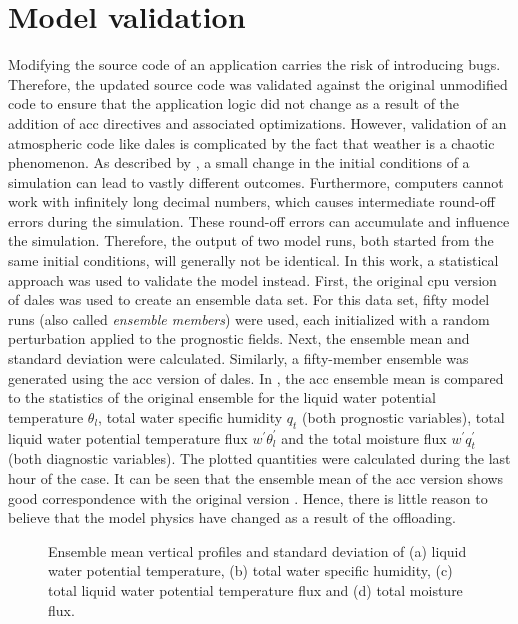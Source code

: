 \section{Model validation}
Modifying the source code of an application carries the risk of introducing bugs. Therefore, the updated source code was validated against the original unmodified code to ensure that the application logic did not change as a result of the addition of \acrshort{acc} directives and associated optimizations. However, validation of an atmospheric code like \acrshort{dales} is complicated by the fact that weather is a chaotic phenomenon. As described by \citet{lorenzDeterministicNonperiodicFlow1963}, a small change in the initial conditions of a simulation can lead to vastly different outcomes. Furthermore, computers cannot work with infinitely long decimal numbers, which causes intermediate round-off errors during the simulation. These round-off errors can accumulate and influence the simulation. Therefore, the output of two model runs, both started from the same initial conditions, will generally not be identical. In this work, a statistical approach was used to validate the model instead. First, the original \acrshort{cpu} version of \acrshort{dales} was used to create an ensemble data set. For this data set, fifty model runs (also called \emph{ensemble members}) were used, each initialized with a random perturbation applied to the prognostic fields. Next, the ensemble mean and standard deviation were calculated. Similarly, a fifty-member ensemble was generated using the \acrshort{acc} version of \acrshort{dales}. In , the \acrshort{acc} ensemble mean is compared to the statistics of the original ensemble for the liquid water potential temperature $\theta_l$, total water specific humidity $q_t$ (both prognostic variables), total liquid water potential temperature flux $w^\prime \theta_l^\prime$ and the total moisture flux $w^\prime q_t^\prime$ (both diagnostic variables). The plotted quantities were calculated during the last hour of the case. It can be seen that the ensemble mean of the \acrshort{acc} version shows good correspondence with the original version . Hence, there is little reason to believe that the model physics have changed as a result of the offloading.

\begin{figure}
    \centering
    
    \caption{Ensemble mean vertical profiles and standard deviation of (a) liquid water potential temperature, (b) total water specific humidity, (c) total liquid water potential temperature flux and (d) total moisture flux.}
    \label{fig:validation}
\end{figure} 

